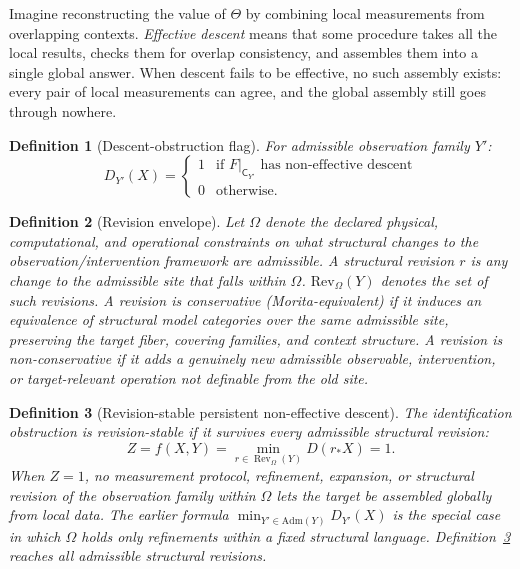 \documentclass[11pt]{article}
\newtheorem{definition}{Definition}
\begin{document}
Imagine reconstructing the value of $\Theta$ by combining local measurements
from overlapping contexts. \emph{Effective descent} means that some procedure
takes all the local results, checks them for overlap consistency, and assembles
them into a single global answer. When descent fails to be effective, no such
assembly exists: every pair of local measurements can agree, and the global
assembly still goes through nowhere.

\begin{definition}[Descent-obstruction flag]
For admissible observation family $Y'$:
\[
D_{Y'}(X) =
\begin{cases}
1 & \text{if } F|_{\mathsf{C}_{Y'}} \text{ has non-effective descent} \\
0 & \text{otherwise.}
\end{cases}
\]
\end{definition}

\begin{definition}[Revision envelope]
\label{def:revenv}
Let $\Omega$ denote the declared physical, computational, and operational
constraints on what structural changes to the observation/intervention
framework are admissible.
A \emph{structural revision} $r$ is any change to the admissible site that
falls within $\Omega$.
$\mathrm{Rev}_\Omega(Y)$ denotes the set of such revisions.
A revision is \emph{conservative} (Morita-equivalent) if it induces an
equivalence of structural model categories over the same admissible site,
preserving the target fiber, covering families, and context structure.
A revision is \emph{non-conservative} if it adds a genuinely new admissible
observable, intervention, or target-relevant operation not definable from
the old site.
\end{definition}

\begin{definition}[Revision-stable persistent non-effective descent]
\label{def:revstable}
The identification obstruction is \emph{revision-stable} if it survives every
admissible structural revision:
\[
Z = f(X, Y) = \min_{r \in \operatorname{Rev}_\Omega(Y)} D(r_* X) = 1.
\]
When $Z = 1$, no measurement protocol, refinement, expansion, or structural
revision of the observation family within $\Omega$ lets the target be assembled
globally from local data. The earlier formula
$\min_{Y' \in \mathrm{Adm}(Y)} D_{Y'}(X)$ is the special case in which $\Omega$
holds only refinements within a fixed structural language.
Definition~\ref{def:revstable} reaches all admissible structural revisions.
\end{definition}
\end{document}
